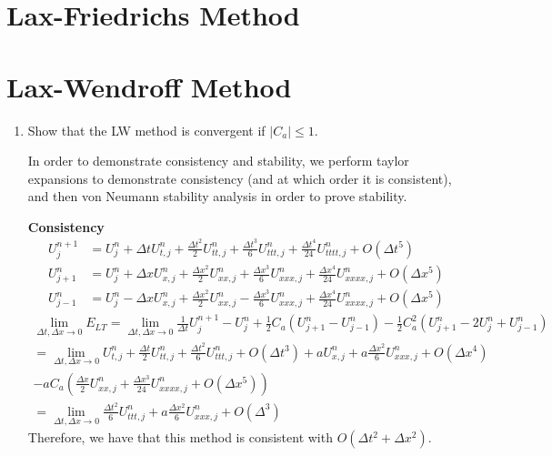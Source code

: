 \documentclass{article}
\begin{document}
\section{Lax-Friedrichs Method}


\section{Lax-Wendroff Method}

\begin{enumerate}[label = (\alph*)]
    \item Show that the LW method is convergent if $|C_a| \le 1$. 
    
        In order to demonstrate consistency and stability, we perform taylor
        expansions to demonstrate consistency (and at which order it is
        consistent), and then von Neumann stability analysis in order to prove
        stability.

        \textbf{Consistency}
        \begin{align*}
            U_j^{n+1} &= U_j^n + \Delta t U_{t, j}^n + 
            \frac{\Delta t^2}{2}U_{tt, j}^n + \frac{\Delta t^3}{6}U_{ttt, j}^n
            + \frac{\Delta t^4}{24}U_{tttt, j}^n + O(\Delta t^5)\\
            U_{j+1}^{n} &= U_j^n + \Delta x U_{x, j}^n + 
            \frac{\Delta x^2}{2}U_{xx, j}^n + \frac{\Delta x^3}{6}U_{xxx, j}^n
            + \frac{\Delta x^4}{24}U_{xxxx, j}^n + O(\Delta x^5)\\
            U_{j-1}^{n} &= U_j^n - \Delta x U_{x, j}^n + 
            \frac{\Delta x^2}{2}U_{xx, j}^n - \frac{\Delta x^3}{6}U_{xxx, j}^n
            + \frac{\Delta x^4}{24}U_{xxxx, j}^n + O(\Delta x^5)
        \end{align*}
        \begin{gather*}
            \lim_{\Delta t, \Delta x \to 0} E_{LT} = 
            \lim_{\Delta t, \Delta x \to 0} \frac{1}{\Delta t} U_j^{n+1} - U_j^n
            + \frac{1}{2}C_a\left(U_{j+1}^n - U_{j-1}^n\right)
            - \frac{1}{2}C_a^2\left(U_{j+1}^n - 2U_j^n + U_{j-1}^n\right)\\
           =  \lim_{\Delta t, \Delta x \to 0} U_{t, j}^n + 
            \frac{\Delta t}{2}U_{tt, j}^n + \frac{\Delta t^2}{6}U_{ttt, j}^n +
            O(\Delta t^3)
            + aU_{x, j}^n + a\frac{\Delta
            x^2}{6}U_{xxx, j}^n + O(\Delta x^4) \\- aC_a\left(
            \frac{\Delta x}{2}U_{xx, j}^n + \frac{\Delta x^3}{24}U_{xxxx, j}^n
            + O(\Delta x^5)\right)\\
            = \lim_{\Delta t, \Delta x \to 0} \frac{\Delta t^2}{6}U_{ttt, j}^n +
            a \frac{\Delta x^2}{6}U_{xxx, j}^n + O(\Delta^3)
        \end{gather*}
        Therefore, we have that this method is consistent with $O(\Delta t^2 +
        \Delta x^2)$. 


\end{enumerate}
\end{document}
